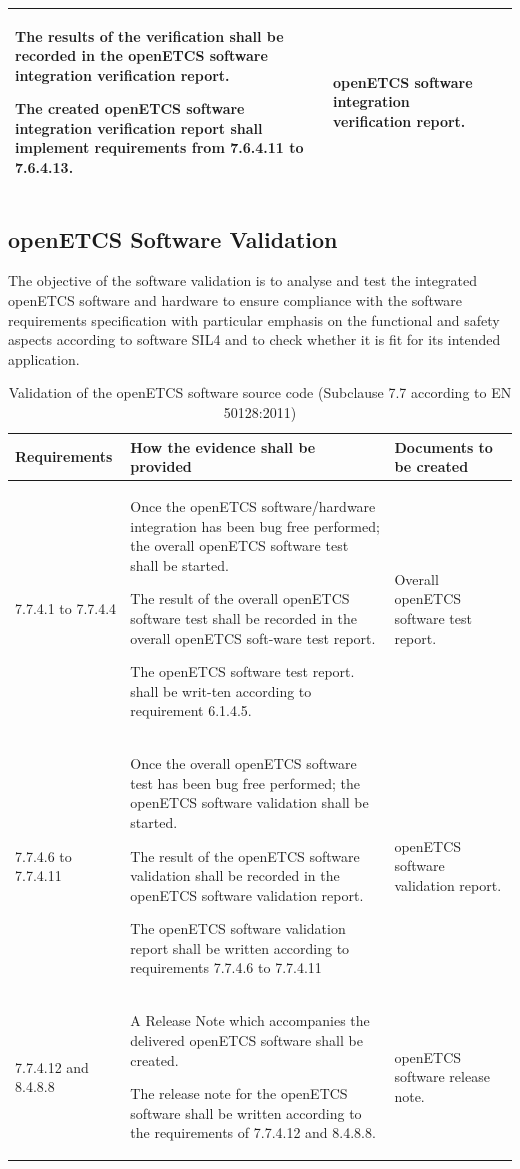 \documentclass{template/openetcs_report}
\begin{document}
{\begin{longtable}{|p{2cm}|p{9cm}|p{3cm}|}
The results of the verification shall be recorded in the openETCS software integration verification report.

The created openETCS software integration verification report shall implement requirements from 7.6.4.11 to 7.6.4.13.
& openETCS software integration verification report.\\ 
\hline
\end{longtable}}



\subsection{openETCS Software Validation}
\label{ValSW}
\begin{flushleft}
The objective of the software validation is to analyse and test the integrated openETCS software and hardware to ensure compliance with the software requirements specification with particular emphasis on the functional and safety aspects according to software SIL4 and to check whether it is fit for its intended application.
\end{flushleft}
{\footnotesize\sffamily\centering
\begin{longtable}{|p{2cm}|p{9cm}|p{3cm}|}
\caption{Validation of the openETCS software source code  (Subclause 7.7 according to EN 50128:2011)}\\
\hline
\bfseries Requirements & \bfseries How the evidence shall be provided & \bfseries Documents to be created\\
\hline
\hline
\endhead
\hline
\endfoot

7.7.4.1 to 7.7.4.4 & Once the openETCS software/hardware integration has been bug free performed; the overall openETCS software test shall be started.

The result of the overall openETCS software test shall be recorded in the overall openETCS soft-ware test report.

The openETCS software test report. shall be writ-ten according to requirement 6.1.4.5.
& Overall openETCS software test report.\\ 
\hline
7.7.4.6 to 7.7.4.11 & Once the overall openETCS software test has been bug free performed; the openETCS software validation shall be started.

The result of the openETCS software validation shall be recorded in the openETCS software validation report.

The openETCS software validation report shall be written according to requirements 7.7.4.6 to 7.7.4.11
& openETCS software validation report.\\ 
\hline
7.7.4.12 and 8.4.8.8 & A Release Note which accompanies the delivered openETCS software shall be created.

The release note for the openETCS software shall be written according to the requirements of 7.7.4.12 and 8.4.8.8.
& openETCS software release note.\\ 
\hline
\end{longtable}}
\end{document}

